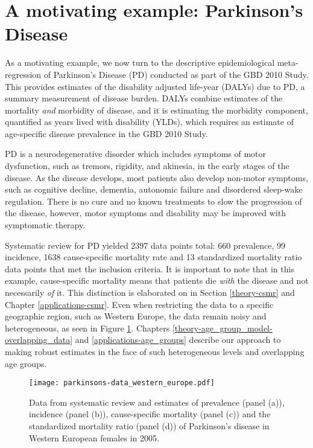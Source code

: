 \section{A motivating example: Parkinson's Disease}
\label{intro-complete_ex}

As a motivating example, we now turn to the descriptive epidemiological meta-regression of Parkinson's Disease (PD) conducted as part of the GBD 2010 Study.  This provides estimates of the disability adjusted life-year (DALYs) due to PD, a summary measurement of disease burden.  DALYs combine estimates of the mortality \emph{and} morbidity of disease, and it is estimating the morbidity component, quantified as years lived with disability (YLDs), which requires an estimate of age-specific disease prevalence in the GBD 2010 Study.

PD is a neurodegenerative disorder which includes symptoms of motor dysfunction, such as tremors, rigidity, and akinesia, in the early stages of the disease.  As the disease develops, most patients also develop non-motor symptoms, such as cognitive decline, dementia, autonomic failure and disordered sleep-wake regulation.  There is no cure and no known treatments to slow the progression of the disease, however, motor symptoms and disability may be improved with symptomatic therapy.\cite{poewe_natural_2006, pollock_prevalence_1966}

Systematic review for PD yielded 2397 data points total: 660 prevalence, 99 incidence, 1638 cause-specific mortality rate and 13 standardized mortality ratio data points that met the inclusion criteria.  It is important to note that in this example, cause-specific mortality means that patients die \emph{with} the disease and not necessarily \emph{of} it.  This distinction is elaborated on in Section \ref{theory-csmr} and Chapter \ref{applications-csmr}.  Even when restricting the data to a specific geographic region, such as Western Europe, the data remain noisy and heterogeneous, as seen in Figure \ref{fig:intro-parkinsons data}. Chapters \ref{theory-age_group_model-overlapping_data} and \ref{applications-age_groups} describe our approach to making robust estimates in the face of such heterogeneous levels and overlapping age groups.

    \begin{figure}[h]
        \begin{center}
            \texttt{[image: parkinsons-data\_western\_europe.pdf]}
            \caption{Data from systematic review and estimates of prevalence (panel (a)), incidence (panel (b)), cause-specific mortality (panel (c)) and the standardized mortality ratio (panel (d)) of Parkinson's disease in Western European females in 2005.}
            \label{fig:intro-parkinsons data}
        \end{center}
    \end{figure}

